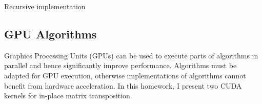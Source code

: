 \documentclass[conference]{IEEEtran}
\begin{document}
    \begin{algorithm}
        \BlankLine
        \caption{Recursive implementation}
        \label{fig:rec_implementation}        
    \end{algorithm}

    \subsection{GPU Algorithms}
    Graphics Processing Units (GPUs) can be used to execute parts of algorithms in parallel and hence significantly improve performance. Algorithms must be adapted for GPU execution, otherwise implementations of algorithms cannot benefit from hardware acceleration. In this homework, I present two CUDA kernels for in-place matrix transposition. 
\end{document}
